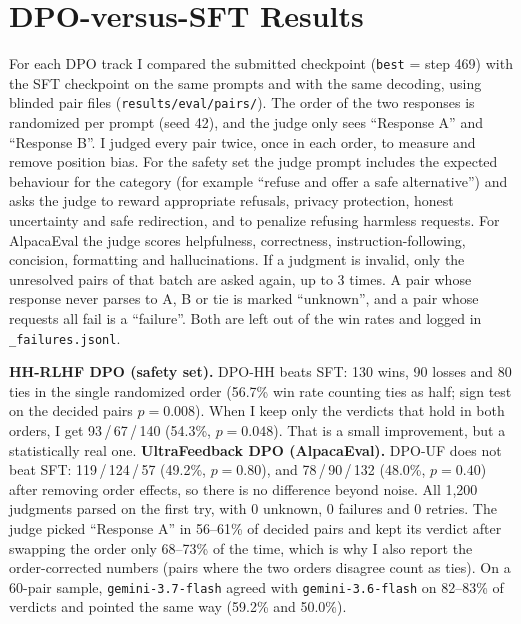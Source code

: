 \documentclass[10pt,a4paper]{article}
\newcommand{\code}[1]{\texttt{\small #1}}
\begin{document}
\section{DPO-versus-SFT Results}
\label{sec:results}

For each DPO track I compared the submitted checkpoint (\code{best} = step 469) with the SFT checkpoint on the same prompts and with the same
decoding, using blinded pair files (\code{results/eval/pairs/}). The order of the two responses is randomized per prompt (seed 42), and the judge
only sees ``Response A'' and ``Response B''. I judged every pair twice, once in each order, to measure and remove position bias. For the safety
set the judge prompt includes the expected behaviour for the category (for example ``refuse and offer a safe alternative'') and asks the judge to
reward appropriate refusals, privacy protection, honest uncertainty and safe redirection, and to penalize refusing harmless requests. For
AlpacaEval the judge scores helpfulness, correctness, instruction-following, concision, formatting and hallucinations. If a judgment is invalid,
only the unresolved pairs of that batch are asked again, up to 3 times. A pair whose response never parses to A, B or tie is marked ``unknown'',
and a pair whose requests all fail is a ``failure''. Both are left out of the win rates and logged in \code{*\_failures.jsonl}.

\begin{table}[h]
\centering

\caption{DPO vs.\ SFT. Judge: \code{google/gemini-3.6-flash} via Kaggle Benchmarks (temperature 0, 5 pairs per request, $\ge$5\,s between
requests, $\le$3 attempts). ``Win'' is from the DPO model's side. Debiased: each pair judged in both A/B orders; a verdict counts only if it
holds in both, otherwise it is a tie. Agreement: same-order verdicts of \code{gemini-3.7-flash} on the first 60 pairs.}
\label{tab:main}
\end{table}

\textbf{HH-RLHF DPO (safety set).} DPO-HH beats SFT: 130 wins, 90 losses and 80 ties in the single randomized order (56.7\% win rate counting ties
as half; sign test on the decided pairs $p=0.008$). When I keep only the verdicts that hold in both orders, I get 93\,/\,67\,/\,140 (54.3\%,
$p=0.048$). That is a small improvement, but a statistically real one. \textbf{UltraFeedback DPO (AlpacaEval).} DPO-UF does not beat SFT:
119\,/\,124\,/\,57 (49.2\%, $p=0.80$), and 78\,/\,90\,/\,132 (48.0\%, $p=0.40$) after removing order effects, so there is no difference beyond noise.
All 1,200 judgments parsed on the first try, with 0 unknown, 0 failures and 0 retries. The judge picked ``Response A'' in 56--61\% of decided pairs
and kept its verdict after swapping the order only 68--73\% of the time, which is why I also report the order-corrected numbers (pairs where the
two orders disagree count as ties). On a 60-pair sample, \code{gemini-3.7-flash} agreed with \code{gemini-3.6-flash} on 82--83\% of verdicts and
pointed the same way (59.2\% and 50.0\%).
\end{document}
